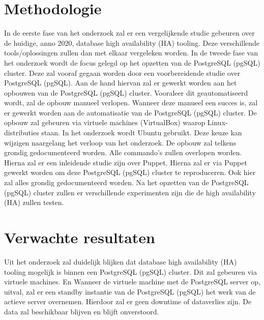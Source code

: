 \section{Methodologie}
\label{sec:methodologie}
In de eerste fase van het onderzoek zal er een vergelijkende studie gebeuren over de huidige, anno 2020, database high availability (HA) tooling. Deze verschillende tools/oplossingen zullen dan met elkaar vergeleken worden. In de tweede fase van het onderzoek wordt de focus gelegd op het opzetten van de PostgreSQL (pgSQL) cluster. Deze zal vooraf gegaan worden door een voorbereidende studie over PostgreSQL (pgSQL). Aan de hand hiervan zal er gewerkt worden aan het opbouwen van de PostgreSQL (pgSQL) cluster. Vooraleer dit geautomatiseerd wordt, zal de opbouw manueel verlopen. Wanneer deze manueel een succes is, zal er gewerkt worden aan de automatisatie van de PostgreSQL (pgSQL) cluster. De opbouw zal gebeuren via virtuele machines (VirtualBox) waarop Linux-distributies staan. In het onderzoek wordt Ubuntu gebruikt. Deze keuze kan wijzigen naargelang het verloop van het onderzoek. De opbouw zal telkens grondig gedocumenteerd worden. Alle commando's zullen overlopen worden. Hierna zal er een inleidende studie zijn over Puppet. Hierna zal er via Puppet gewerkt worden om deze PostgreSQL (pgSQL) cluster te reproduceren. Ook hier zal alles grondig gedocumenteerd worden.
Na het opzetten van de PostgreSQL (pgSQL) cluster zullen er verschillende experimenten zijn die de high availability (HA) zullen testen.





\section{Verwachte resultaten}
\label{sec:verwachte_resultaten}
Uit het onderzoek zal duidelijk blijken dat database high availability (HA) tooling mogelijk is binnen een PostgreSQL (pgSQL) cluster. Dit zal gebeuren via virtuele machines. En Wanneer de virtuele machine met de PostgreSQL server op, uitval, zal er een standby instantie van de PostgreSQL (pgSQL) het werk van de actieve server overnemen. Hierdoor zal er geen downtime of dataverlies zijn. De data zal beschikbaar blijven en blijft onverstoord.

